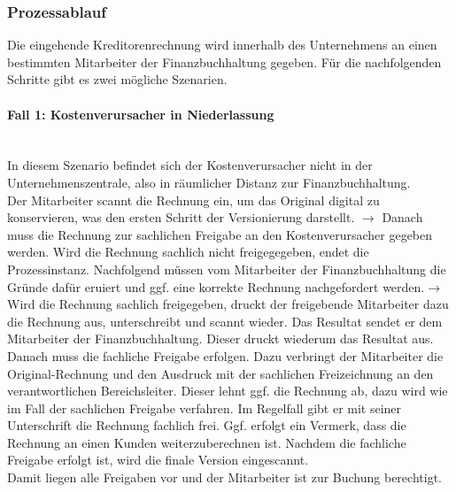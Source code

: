 \subsubsection{Prozessablauf}
Die eingehende Kreditorenrechnung wird innerhalb des Unternehmens an einen bestimmten Mitarbeiter der Finanzbuchhaltung gegeben.
Für die nachfolgenden Schritte gibt es zwei mögliche Szenarien.

\paragraph{Fall 1: Kostenverursacher in Niederlassung}
~\\ 
In diesem Szenario befindet sich der Kostenverursacher nicht in der Unternehmenszentrale, also in räumlicher Distanz zur Finanzbuchhaltung.\\
Der Mitarbeiter scannt die Rechnung ein, um das Original digital zu konservieren, was den ersten Schritt der Versionierung darstellt. $\rightarrow$
Danach muss die Rechnung zur sachlichen Freigabe an den Kostenverursacher gegeben werden. 
Wird die Rechnung sachlich nicht freigegegeben, endet die Prozessinstanz.
Nachfolgend müssen vom Mitarbeiter der Finanzbuchhaltung die Gründe dafür eruiert und ggf. eine korrekte Rechnung nachgefordert werden.$\rightarrow$
Wird die Rechnung sachlich freigegeben, druckt der freigebende Mitarbeiter dazu die Rechnung aus, unterschreibt und scannt wieder.
Das Resultat sendet er dem Mitarbeiter der Finanzbuchhaltung.
Dieser druckt wiederum das Resultat aus.
Danach muss die fachliche Freigabe erfolgen.
Dazu verbringt der Mitarbeiter die Original-Rechnung und den Ausdruck mit der sachlichen Freizeichnung an den verantwortlichen Bereichsleiter.
Dieser lehnt ggf. die Rechnung ab, dazu wird wie im Fall der sachlichen Freigabe verfahren.
Im Regelfall gibt er mit seiner Unterschrift die Rechnung fachlich frei.
Ggf. erfolgt ein Vermerk, dass die Rechnung an einen Kunden weiterzuberechnen ist. 
Nachdem die fachliche Freigabe erfolgt ist, wird die finale Version eingescannt.\\
Damit liegen alle Freigaben vor und der Mitarbeiter ist zur Buchung berechtigt.

